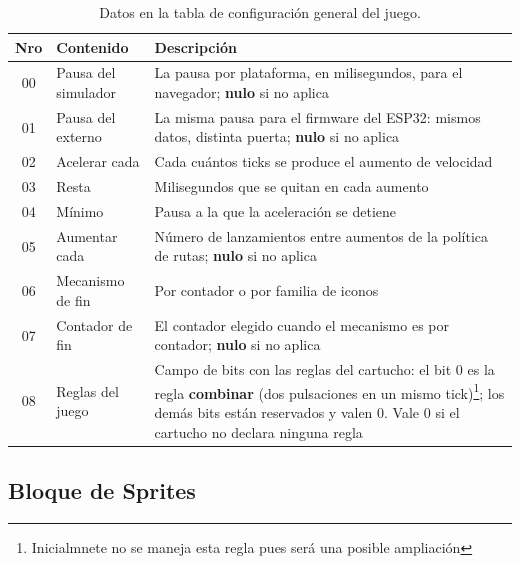 \begin{table}[H]
	\centering
	\begin{tabular}{|c|l|p{9.5cm}|}
		\hline
		\textbf{Nro} & \textbf{Contenido} & \textbf{Descripción} \\
		\hline
		
		00 & Pausa del simulador & La pausa por plataforma, en milisegundos, para el navegador; \textbf{nulo} si no aplica  \\ \hline
		
		01 & Pausa del externo & La misma pausa para el firmware del ESP32: mismos datos, distinta puerta; \textbf{nulo} si no aplica  \\ \hline
		
		02 & Acelerar cada & Cada cuántos ticks se produce el aumento de velocidad\\ \hline
		
		03 & Resta & Milisegundos que se quitan en cada aumento\\ \hline
		
		04 & Mínimo & Pausa a la que la aceleración se detiene\\ \hline
		
		05 & Aumentar cada & Número de lanzamientos entre aumentos de la política de rutas; \textbf{nulo} si no aplica  \\ \hline
		
		06 & Mecanismo de fin & Por contador o por familia de iconos \\ \hline
		
		07 & Contador de fin & El contador elegido cuando el mecanismo es por contador; \textbf{nulo} si no aplica \\ \hline
		
		08 & Reglas del juego & Campo de bits con las reglas del cartucho: el bit 0 es la regla \textbf{combinar} (dos pulsaciones en un mismo tick)\footnote{Inicialmnete no se maneja esta regla pues será una posible ampliación}; los demás bits están reservados y valen 0. Vale 0 si el cartucho no declara ninguna regla \\ \hline
			
	\end{tabular}
	\caption{Datos en la tabla de configuración general del juego.}
	\label{tab:configuracionGeneral}
\end{table}


\subsection{Bloque de Sprites}
\label{sec:F5I2Sprites}

